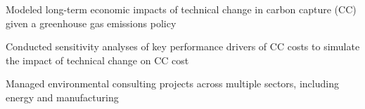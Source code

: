 \documentclass[letterpaper]{deedy-resume} %
\begin{document}
\begin{minipage}[t]{0.66\textwidth}
\begin{tightitemize}
\item Modeled long-term economic impacts of technical change in carbon capture (CC) given a greenhouse gas emissions policy
\item Conducted sensitivity analyses of key performance drivers of CC costs to simulate the impact of technical change on CC cost
\end{tightitemize}
\sectionspace %

\begin{tightitemize}
\item Managed environmental consulting projects across multiple sectors, including energy and manufacturing
\end{tightitemize}
\sectionspace %


\end{minipage} %








\end{document}
